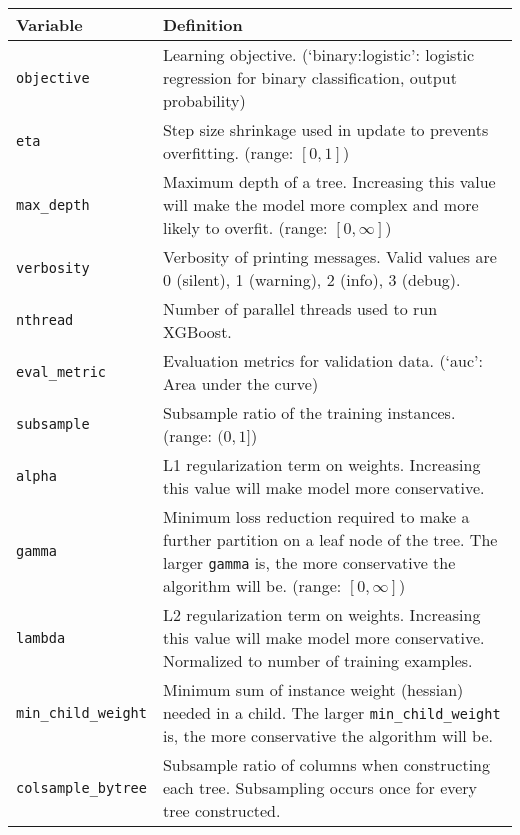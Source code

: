 \begin{tabular}{p{.25\linewidth}p{.75\linewidth}}
\toprule
Variable & Definition \\
\midrule
\verb|objective| & Learning objective. (`binary:logistic': logistic regression for binary classification, output probability) \\
\midrule
\verb|eta| & Step size shrinkage used in update to prevents overfitting. (range: $[0,1]$) \\
\midrule
\verb|max_depth| & Maximum depth of a tree. Increasing this value will make the model more complex and more likely to overfit. (range: $[0,\infty]$) \\
\midrule
\verb|verbosity| & Verbosity of printing messages. Valid values are 0 (silent), 1 (warning), 2 (info), 3 (debug). \\
\midrule
\verb|nthread| & Number of parallel threads used to run XGBoost. \\
\midrule
\verb|eval_metric| & Evaluation metrics for validation data. (`auc': Area under the curve) \\
\midrule
\verb|subsample| & Subsample ratio of the training instances. (range: $(0,1]$) \\
\midrule
\verb|alpha| & L1 regularization term on weights. Increasing this value will make model more conservative. \\
\midrule
\verb|gamma| & Minimum loss reduction required to make a further partition on a leaf node of the tree. The larger \verb|gamma| is, the more conservative the algorithm will be. (range: $[0,\infty]$) \\
\midrule
\verb|lambda| & L2 regularization term on weights. Increasing this value will make model more conservative. Normalized to number of training examples. \\
\midrule
\verb|min_child_weight| & Minimum sum of instance weight (hessian) needed in a child. The larger \verb|min_child_weight| is, the more conservative the algorithm will be. \\
\midrule
\verb|colsample_bytree| & Subsample ratio of columns when constructing each tree. Subsampling occurs once for every tree constructed. \\
\bottomrule
\end{tabular}